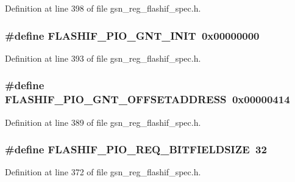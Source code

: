 Definition at line 398 of file gsn\_\-reg\_\-flashif\_\-spec.h.

\hypertarget{a00552_a56841b54b4af6e12c6d72ad4a0105336}{
\subsubsection[{FLASHIF\_\-PIO\_\-GNT\_\-INIT}]{\setlength{\rightskip}{0pt plus 5cm}\#define FLASHIF\_\-PIO\_\-GNT\_\-INIT~0x00000000}}
\label{a00552_a56841b54b4af6e12c6d72ad4a0105336}


Definition at line 393 of file gsn\_\-reg\_\-flashif\_\-spec.h.

\hypertarget{a00552_aada2112b1fc8a7c3d3415697535c2cba}{
\subsubsection[{FLASHIF\_\-PIO\_\-GNT\_\-OFFSETADDRESS}]{\setlength{\rightskip}{0pt plus 5cm}\#define FLASHIF\_\-PIO\_\-GNT\_\-OFFSETADDRESS~0x00000414}}
\label{a00552_aada2112b1fc8a7c3d3415697535c2cba}


Definition at line 389 of file gsn\_\-reg\_\-flashif\_\-spec.h.

\hypertarget{a00552_abb70bc848ef280826de4bc984546b94e}{
\subsubsection[{FLASHIF\_\-PIO\_\-REQ\_\-BITFIELDSIZE}]{\setlength{\rightskip}{0pt plus 5cm}\#define FLASHIF\_\-PIO\_\-REQ\_\-BITFIELDSIZE~32}}
\label{a00552_abb70bc848ef280826de4bc984546b94e}


Definition at line 372 of file gsn\_\-reg\_\-flashif\_\-spec.h.

